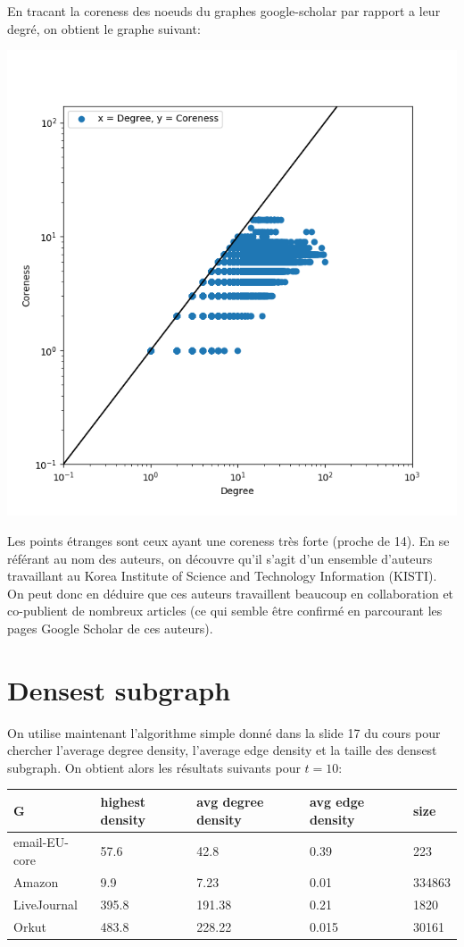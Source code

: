 \documentclass[a4paper]{report}
\begin{document}
En tracant la coreness des noeuds du graphes google-scholar par rapport a leur degré, on obtient le graphe suivant:
\begin{center}
  \includegraphics[height=.30\paperwidth]{assets/scholardegreecoreness.png}
\end{center}

Les points étranges sont ceux ayant une coreness très forte (proche de 14). En se référant au nom des auteurs, on découvre qu'il s'agit d'un ensemble d'auteurs travaillant au Korea Institute of Science and Technology Information (KISTI). On peut donc en déduire que ces auteurs travaillent beaucoup en collaboration et co-publient de nombreux articles (ce qui semble être confirmé en parcourant les pages Google Scholar de ces auteurs).

\section{Densest subgraph}
On utilise maintenant l'algorithme simple donné dans la slide 17 du cours pour chercher l'average degree density, l'average edge density et la taille des densest subgraph. On obtient alors les résultats suivants pour $t=10$:
\begin{center}
  \begin{tabular}{|l|l|l|l|l|}
    \hline
    G & highest density & avg degree density & avg edge density & size\\
    \hline
    email-EU-core & 57.6 & 42.8 & 0.39 & 223\\
    Amazon & 9.9 & 7.23 & 0.01 & 334863\\
    LiveJournal & 395.8 & 191.38 & 0.21 & 1820 \\
    Orkut & 483.8 & 228.22 & 0.015 & 30161 \\
    \hline
  \end{tabular}
\end{center}
\end{document}
